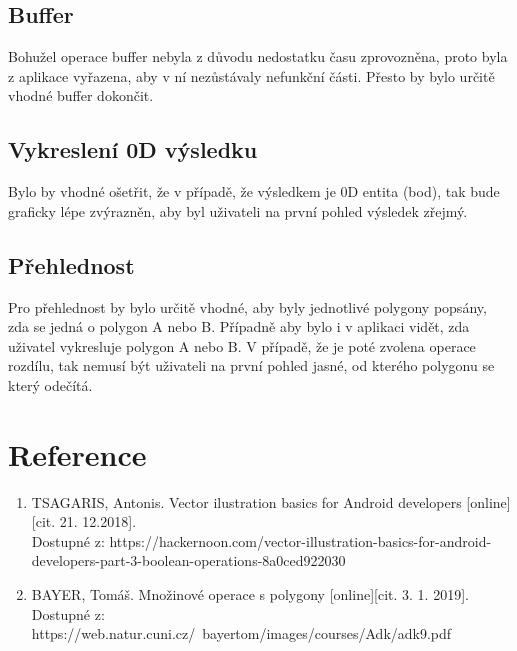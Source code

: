 \documentclass[a4paper, 12pt]{article}
\begin{document}
\subsection{Buffer}
Bohužel operace buffer nebyla z důvodu nedostatku času zprovozněna, proto byla z aplikace vyřazena, aby v ní nezůstávaly nefunkční části. Přesto by bylo určitě vhodné buffer dokončit. 

\subsection{Vykreslení 0D výsledku}
Bylo by vhodné ošetřit, že v případě, že výsledkem je 0D entita (bod), tak bude graficky lépe zvýrazněn, aby byl uživateli na první pohled výsledek zřejmý.

\subsection{Přehlednost}
Pro přehlednost by bylo určitě vhodné, aby byly jednotlivé polygony popsány, zda se jedná o polygon A nebo B. Případně aby bylo i v aplikaci vidět, zda uživatel vykresluje polygon A nebo B. V případě, že je poté zvolena operace rozdílu, tak nemusí být uživateli na první pohled jasné, od kterého polygonu se který odečítá.



\clearpage
\section{Reference}

\begin{enumerate}
\item TSAGARIS, Antonis. Vector ilustration basics for Android developers [online][cit. 21. 12.2018]. \\
Dostupné z: https://hackernoon.com/vector-illustration-basics-for-android-developers-part-3-boolean-operations-8a0ced922030 \\

\item  BAYER, Tomáš. Množinové operace s polygony [online][cit. 3. 1. 2019]. \\
Dostupné z: https://web.natur.cuni.cz/~bayertom/images/courses/Adk/adk9.pdf  \\


\end{enumerate}
\end{document}
